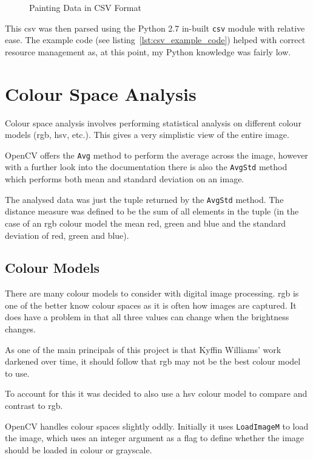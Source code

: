 \begin{figure}[h]
\caption{Painting Data in CSV Format}\label{fig:csv-spreadsheet}
\end{figure}

This \gls{csv} was then parsed using the Python 2.7 in-built \texttt{csv} module with relative 
ease. The example code (see listing~\ref{lst:csv_example_code}) helped with correct resource 
management as, at this point, my Python knowledge was fairly low.


\section{Colour Space Analysis}
Colour space analysis involves performing statistical analysis on different colour models 
(\gls{rgb}, \gls{hsv}, etc.). This gives a very simplistic view of the entire image.

OpenCV offers the \texttt{Avg} method to perform the average across the image, however with a 
further look into the documentation there is also the \texttt{AvgStd} method which performs both 
mean and standard deviation on an image.

The analysed data was just the tuple returned by the \texttt{AvgStd} method. The distance measure
was defined to be the sum of all elements in the tuple (in the case of an \gls{rgb} colour model
the mean red, green and blue and the standard deviation of red, green and blue).

\subsection{Colour Models}
There are many colour models to consider with digital image processing. \Gls{rgb} is one of the
better know colour spaces as it is often how images are captured. It does have a problem in that
all three values can change when the brightness changes.

As one of the main principals of this project is that Kyffin Williams' work darkened over time, it
should follow that \gls{rgb} may not be the best colour model to use.

To account for this it was decided to also use a \gls{hsv} colour model to compare and contrast to
\gls{rgb}.

OpenCV handles colour spaces slightly oddly. Initially it uses \texttt{LoadImageM} to load the 
image, which uses an integer argument as a flag to define whether the image should be loaded in 
colour or grayscale.

